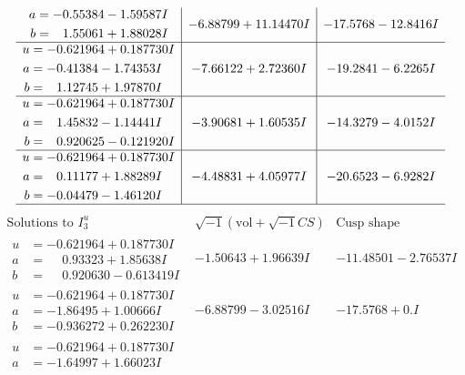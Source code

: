 \documentclass[1p]{elsarticle_modified}
\theoremstyle{definition}
\newcommand{\I}{\sqrt{-1}}
\begin{document}
$$\begin{array}{c|c|c}
\begin{aligned}
a &= -0.55384 - 1.59587 I \\
b &= \phantom{-}1.55061 + 1.88028 I\end{aligned}
 & -6.88799 + 11.14470 I & -17.5768 - 12.8416 I \\ \hline\begin{aligned}
u &= -0.621964 + 0.187730 I \\
a &= -0.41384 - 1.74353 I \\
b &= \phantom{-}1.12745 + 1.97870 I\end{aligned}
 & -7.66122 + 2.72360 I & -19.2841 - 6.2265 I \\ \hline\begin{aligned}
u &= -0.621964 + 0.187730 I \\
a &= \phantom{-}1.45832 - 1.14441 I \\
b &= \phantom{-}0.920625 - 0.121920 I\end{aligned}
 & -3.90681 + 1.60535 I & -14.3279 - 4.0152 I \\ \hline\begin{aligned}
u &= -0.621964 + 0.187730 I \\
a &= \phantom{-}0.11177 + 1.88289 I \\
b &= -0.04479 - 1.46120 I\end{aligned}
 & -4.48831 + 4.05977 I & -20.6523 - 6.9282 I\\
 \hline 
 \end{array}$$\newpage$$\begin{array}{c|c|c}  
\text{Solutions to }I^u_{3}& \I (\text{vol} + \sqrt{-1}CS) & \text{Cusp shape}\\
 \hline 
\begin{aligned}
u &= -0.621964 + 0.187730 I \\
a &= \phantom{-}0.93323 + 1.85638 I \\
b &= \phantom{-}0.920630 - 0.613419 I\end{aligned}
 & -1.50643 + 1.96639 I & -11.48501 - 2.76537 I \\ \hline\begin{aligned}
u &= -0.621964 + 0.187730 I \\
a &= -1.86495 + 1.00666 I \\
b &= -0.936272 + 0.262230 I\end{aligned}
 & -6.88799 - 3.02516 I & -17.5768 + 0. I\phantom{ +0.000000I} \\ \hline\begin{aligned}
u &= -0.621964 + 0.187730 I \\
a &= -1.64997 + 1.66023 I \\

\end{aligned}
\end{array}$$
\end{document}
